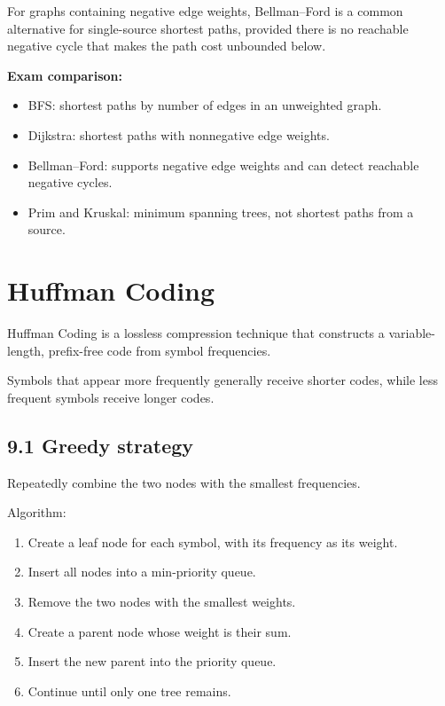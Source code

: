 For graphs containing negative edge weights, Bellman--Ford is a common alternative for single-source shortest paths, provided there is no reachable negative cycle that makes the path cost unbounded below.

\textbf{Exam comparison:}

\begin{itemize}
    \item BFS: shortest paths by number of edges in an unweighted graph.
    \item Dijkstra: shortest paths with nonnegative edge weights.
    \item Bellman--Ford: supports negative edge weights and can detect reachable negative cycles.
    \item Prim and Kruskal: minimum spanning trees, not shortest paths from a source.
\end{itemize}

\section{Huffman Coding}

Huffman Coding is a lossless compression technique that constructs a variable-length, prefix-free code from symbol frequencies.

Symbols that appear more frequently generally receive shorter codes, while less frequent symbols receive longer codes.

\subsection{9.1 Greedy strategy}

Repeatedly combine the two nodes with the smallest frequencies.

Algorithm:

\begin{enumerate}
    \item Create a leaf node for each symbol, with its frequency as its weight.
    \item Insert all nodes into a min-priority queue.
    \item Remove the two nodes with the smallest weights.
    \item Create a parent node whose weight is their sum.
    \item Insert the new parent into the priority queue.
    \item Continue until only one tree remains.
\end{enumerate}

